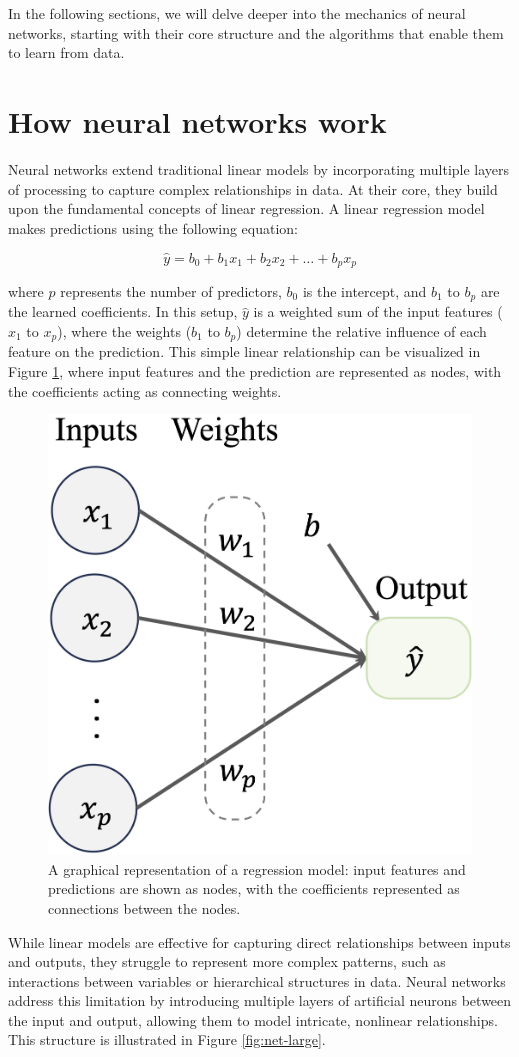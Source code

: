 \documentclass[
  11pt,
]{book}
\theoremstyle{definition}
\theoremstyle{definition}
\theoremstyle{definition}
\theoremstyle{definition}
\theoremstyle{remark}
\begin{document}
In the following sections, we will delve deeper into the mechanics of neural networks, starting with their core structure and the algorithms that enable them to learn from data.

\section{How neural networks work}\label{how-neural-networks-work}

Neural networks extend traditional linear models by incorporating multiple layers of processing to capture complex relationships in data. At their core, they build upon the fundamental concepts of linear regression. A linear regression model makes predictions using the following equation:

\[
\hat{y} = b_0 + b_1 x_1 + b_2 x_2 + \dots + b_p x_p
\]

where \(p\) represents the number of predictors, \(b_0\) is the intercept, and \(b_1\) to \(b_p\) are the learned coefficients. In this setup, \(\hat{y}\) is a weighted sum of the input features (\(x_1\) to \(x_p\)), where the weights (\(b_1\) to \(b_p\)) determine the relative influence of each feature on the prediction. This simple linear relationship can be visualized in Figure \ref{fig:net-reg}, where input features and the prediction are represented as nodes, with the coefficients acting as connecting weights.

\begin{figure}[H]

{\centering \includegraphics[width=0.4\linewidth]{images/ch12_net_reg} 

}

\caption{A graphical representation of a regression model: input features and predictions are shown as nodes, with the coefficients represented as connections between the nodes.}\label{fig:net-reg}
\end{figure}

While linear models are effective for capturing direct relationships between inputs and outputs, they struggle to represent more complex patterns, such as interactions between variables or hierarchical structures in data. Neural networks address this limitation by introducing multiple layers of artificial neurons between the input and output, allowing them to model intricate, nonlinear relationships. This structure is illustrated in Figure \ref{fig:net-large}.
\end{document}
